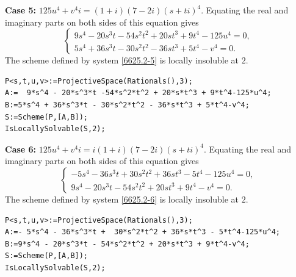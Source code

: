 \documentclass[a4paper,12pt,english,reqno]{amsart}
\begin{document}
{\bf Case 5:} $125u^4+v^4i=(1+i)(7-2i)(s+ti)^4$. Equating the real and imaginary parts on both sides of this equation gives
\begin{equation}\label{6625.2-5}
\begin{cases}
9s^4 - 20s^3t - 54s^2t^2 + 20st^3 + 9t^4 - 125u^4=0,\\
5s^4 + 36s^3t - 30s^2t^2 - 36st^3 + 5t^4 - v^4=0.
\end{cases}
\end{equation}
The scheme defined by system \eqref{6625.2-5} is locally insoluble at $2$.

\begin{lstlisting}
P<s,t,u,v>:=ProjectiveSpace(Rationals(),3);
A:=  9*s^4 - 20*s^3*t -54*s^2*t^2 + 20*s*t^3 + 9*t^4-125*u^4;
B:=5*s^4 + 36*s^3*t - 30*s^2*t^2 - 36*s*t^3 + 5*t^4-v^4;
S:=Scheme(P,[A,B]);
IsLocallySolvable(S,2);
\end{lstlisting}

{\bf Case 6:} $125u^4+v^4i=i(1+i)(7-2i)(s+ti)^4$. Equating the real and imaginary parts on both sides of this equation gives
\begin{equation}\label{6625.2-6}
\begin{cases}
-5s^4 - 36s^3t + 30s^2t^2 + 36st^3 - 5t^4 - 125u^4=0,\\
9s^4 - 20s^3t - 54s^2t^2 + 20st^3 + 9t^4 - v^4=0.
\end{cases}
\end{equation}
The scheme defined by system \eqref{6625.2-6} is locally insoluble at $2$.

\begin{lstlisting}
P<s,t,u,v>:=ProjectiveSpace(Rationals(),3);
A:=- 5*s^4 - 36*s^3*t +  30*s^2*t^2 + 36*s*t^3 - 5*t^4-125*u^4;
B:=9*s^4 - 20*s^3*t - 54*s^2*t^2 + 20*s*t^3 + 9*t^4-v^4;
S:=Scheme(P,[A,B]);
IsLocallySolvable(S,2);
\end{lstlisting}
\end{document}
